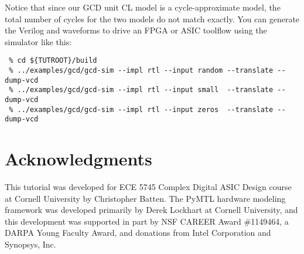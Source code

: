 \documentclass{cbxdoc}
\begin{document}
Notice that since our GCD unit CL model is a cycle-approximate model, the
total number of cycles for the two models do not match exactly. You can
generate the Verilog and waveforms to drive an FPGA or ASIC toolflow
using the simulator like this:

\begin{verbatim}
 % cd ${TUTROOT}/build
 % ../examples/gcd/gcd-sim --impl rtl --input random --translate --dump-vcd
 % ../examples/gcd/gcd-sim --impl rtl --input small  --translate --dump-vcd
 % ../examples/gcd/gcd-sim --impl rtl --input zeros  --translate --dump-vcd
\end{verbatim}


\section*{Acknowledgments}

This tutorial was developed for ECE 5745 Complex Digital ASIC Design
course at Cornell University by Christopher Batten. The PyMTL hardware
modeling framework was developed primarily by Derek Lockhart at Cornell
University, and this development was supported in part by NSF CAREER
Award \#1149464, a DARPA Young Faculty Award, and donations from Intel
Corporation and Synopsys, Inc.
\end{document}
